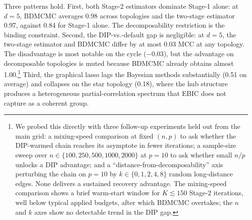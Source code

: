 Three patterns hold. First, both Stage-2 estimators dominate Stage-1 alone: at $d = 5$, BDMCMC averages 0.98 across topologies and the two-stage estimator 0.97, against 0.84 for Stage-1 alone. The decomposability restriction is the binding constraint. Second, the DIP-vs.-default gap is negligible: at $d = 5$, the two-stage estimator and BDMCMC differ by at most 0.03 MCC at any topology. The disadvantage is most notable on the cycle ($-0.03$), but the advantage on decomposable topologies is muted because BDMCMC already obtains almost 1.00.\footnote{We probed this directly with three follow-up experiments held out from the main grid: a mixing-speed comparison at fixed $(n, p)$ to ask whether the DIP-warmed chain reaches its asymptote in fewer iterations; a sample-size sweep over $n \in \{100, 250, 500, 1000, 2000\}$ at $p = 10$ to ask whether small $n / p$ unlocks a DIP advantage; and a ``distance-from-decomposability'' axis perturbing the chain on $p = 10$ by $k \in \{0, 1, 2, 4, 8\}$ random long-distance edges. None delivers a sustained recovery advantage. The mixing-speed comparison shows a brief warm-start window for $K \lesssim 150$ Stage-2 iterations, well below typical applied budgets, after which BDMCMC overtakes; the $n$ and $k$ axes show no detectable trend in the DIP gap.} Third, the graphical lasso lags the Bayesian methods substantially (0.51 on average) and collapses on the star topology (0.18), where the hub structure produces a heterogeneous partial-correlation spectrum that EBIC does not capture as a coherent group. 
